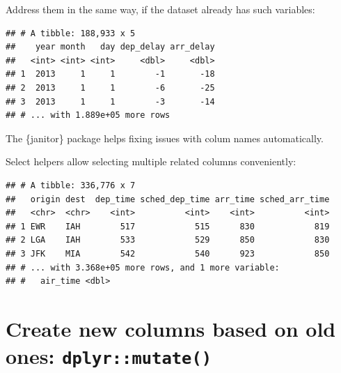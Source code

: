 \documentclass[]{book}
\newenvironment{Shaded}{}{}
\newcommand{\DataTypeTok}[1]{#1}
\newcommand{\KeywordTok}[1]{\textcolor[rgb]{0.00,0.00,1.00}{#1}}
\newcommand{\NormalTok}[1]{#1}
\newcommand{\OperatorTok}[1]{#1}
\newcommand{\StringTok}[1]{\textcolor[rgb]{0.00,0.50,0.50}{#1}}
\begin{document}
Address them in the same way, if the dataset already has such variables:

\begin{Shaded}
\end{Shaded}

\begin{verbatim}
## # A tibble: 188,933 x 5
##    year month   day dep_delay arr_delay
##   <int> <int> <int>     <dbl>     <dbl>
## 1  2013     1     1        -1       -18
## 2  2013     1     1        -6       -25
## 3  2013     1     1        -3       -14
## # ... with 1.889e+05 more rows
\end{verbatim}

The \{janitor\} package helps fixing issues with colum names automatically.

Select helpers allow selecting multiple related columns conveniently:

\begin{Shaded}
\end{Shaded}

\begin{verbatim}
## # A tibble: 336,776 x 7
##   origin dest  dep_time sched_dep_time arr_time sched_arr_time
##   <chr>  <chr>    <int>          <int>    <int>          <int>
## 1 EWR    IAH        517            515      830            819
## 2 LGA    IAH        533            529      850            830
## 3 JFK    MIA        542            540      923            850
## # ... with 3.368e+05 more rows, and 1 more variable:
## #   air_time <dbl>
\end{verbatim}

\hypertarget{create-new-columns-based-on-old-ones-dplyrmutate}{%
\section{\texorpdfstring{Create new columns based on old ones: \texttt{dplyr::mutate()}}{Create new columns based on old ones: dplyr::mutate()}}\label{create-new-columns-based-on-old-ones-dplyrmutate}}
\end{document}
